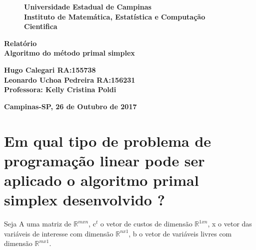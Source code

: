 \documentclass[10pt]{article}
\begin{document}
\begin{titlepage}
\begin{center}
\thispagestyle{empty}
\begin{figure}[!htb]
\begin{center}
\begin{minipage}[b]{0.5\linewidth}
\begin{center}
\end{center}
\end{minipage}
\begin{minipage}[b]{0.7\linewidth}
\begin{center}
\vspace*{1cm}
 {\large \bf Universidade Estadual de Campinas\\[5pt]
Instituto de Matemática, Estatística e Computação Cientifica\\[3pt]
}
\end{center}
\end{minipage}
\end{center}
\end{figure}
\begin{center}
\vspace*{5cm}
{\huge \bf Relatório\\[7pt]
Algoritmo do método primal simplex}
\end{center}
\begin{center}
\vspace*{4cm}
{\Large \bf Hugo Calegari  RA:155738 \\
Leonardo Uchoa Pedreira RA:156231\break
}\\[3pt]
{\large \bf Professora: Kelly Cristina Poldi}\\[5pt]
\end{center}
\centerline{\bf Campinas-SP, 26 de Outubro de 2017}
\end{center}
\end{titlepage}

\section{Em qual tipo de problema de programação linear pode ser aplicado o algoritmo primal simplex desenvolvido ?}

Seja A uma matriz de $\mathbb{R}^{m x n}$, c$^t$ o vetor de custos de dimensão $\mathbb{R}^{1 x n}$, x o vetor das variáveis de interesse com dimensão $\mathbb{R}^{n x 1}$, b o vetor de variáveis livres com dimensão $\mathbb{R}^{m x 1}$.
\newline
\end{document}
